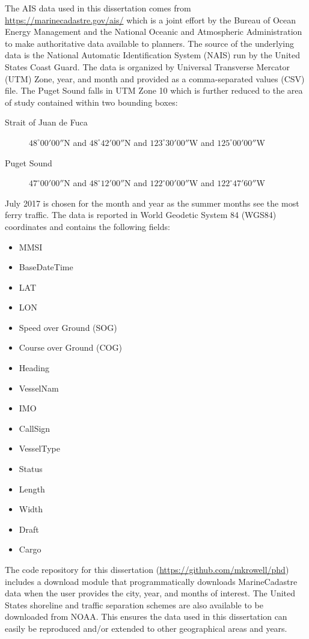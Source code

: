 \documentclass[twoside,symmetric,notoc]{tufte-book}
\begin{document}
\par{
The AIS data used in this dissertation comes from \url{https://marinecadastre.gov/ais/} which is a joint effort by the Bureau of Ocean Energy Management and the National Oceanic and Atmospheric Administration to make authoritative data available to planners. The source of the underlying data is the National Automatic Identification System (NAIS) run by the United States Coast Guard. The data is organized by Universal Transverse Mercator (UTM) Zone, year, and month and provided as a comma-separated values (CSV) file. The Puget Sound falls in UTM Zone 10 which is further reduced to the area of study contained within two bounding boxes:
\begin{description}
    \item[Strait of Juan de Fuca] $48^{\circ} 00'00''$N and $48^{\circ} 42'00''$N and $123^{\circ} 30'00''$W and $125^{\circ} 00'00''$W
    \item[Puget Sound] $47^{\circ} 00'00''$N and $48^{\circ} 12'00''$N and $122^{\circ} 00'00''$W and $122^{\circ} 47'60''$W
\end{description} 
July 2017 is chosen for the month and year as the summer months see the most ferry traffic. The data is reported in World Geodetic System 84 (WGS84) coordinates and contains the following fields: 
\begin{multicols}{3}
\begin{itemize}
    \item MMSI
    \item BaseDateTime
    \item LAT
    \item LON
    \item Speed over Ground (SOG)
    \item Course over Ground (COG)
    \item Heading
    \item VesselNam 
    \item IMO
    \item CallSign
    \item VesselType
    \item Status
    \item Length
    \item Width
    \item Draft
    \item Cargo
\end{itemize}
\end{multicols}
}
\par{%
The code repository for this dissertation (\url{https://github.com/mkrowell/phd}) includes a download module that programmatically downloads MarineCadastre data when the user provides the city, year, and months of interest. The United States shoreline and traffic separation schemes are also available to be downloaded from NOAA. This ensures the data used in this dissertation can easily be reproduced and/or extended to other geographical areas and years.
}
\end{document}

